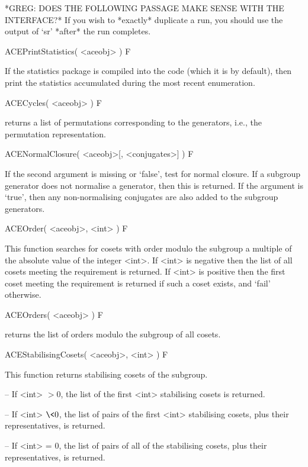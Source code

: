 
*GREG: DOES THE FOLLOWING PASSAGE MAKE SENSE WITH THE INTERFACE?*
If you wish to *exactly* duplicate a run, you should use the output
of `sr' *after* the run completes.


\>ACEPrintStatistics( <aceobj> ) F

If the statistics package is compiled into the code (which it is by
default),
then print the statistics accumulated during the most recent enumeration.



\>ACECycles( <aceobj> ) F

returns a list of permutations corresponding to the generators,
i.e., the permutation representation.

\>ACENormalClosure( <aceobj>[, <conjugates>] ) F

If the second argument is missing or `false', test for normal closure.
If a subgroup  generator  does not  normalise  a  generator,  then this  is
returned.
If  the  argument  is `true',  then  any  non-normalising
conjugates are also added to the subgroup generators.

\>ACEOrder( <aceobj>, <int> ) F

This function searches for cosets with order modulo the subgroup a multiple
of the absolute value of the integer <int>.
If <int> is negative then the list of all cosets meeting the requirement is
returned.
If <int> is positive then the first coset meeting the requirement is
returned if such a coset exists, and `fail' otherwise.

\>ACEOrders( <aceobj> ) F

returns the list of orders modulo the subgroup of all cosets.


\>ACEStabilisingCosets( <aceobj>, <int> ) F

This function returns stabilising cosets of the subgroup.

\beginlist
\item{--} If <int> $> 0$, the list of the first <int> stabilising cosets
    is returned.
\item{--} If <int> $\< 0$, the list of pairs of the first <int> stabilising
    cosets, plus their representatives, is returned.
\item{--} If <int> = $0$, the list of pairs of all of the stabilising cosets,
    plus their representatives, is returned.
\endlist


